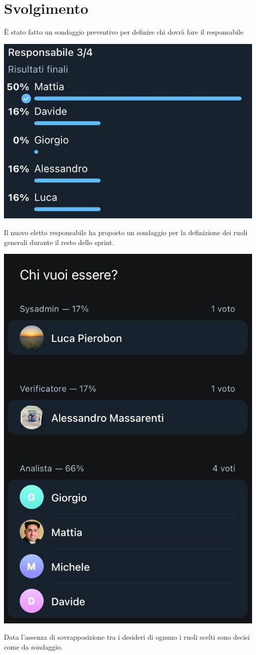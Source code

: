\section{Svolgimento}

È stato fatto un sondaggio preventivo per definire chi dovrà fare il responsabile
\begin{center}
\includegraphics[width = 0.5\linewidth]{img/sondaggio_resposabile.png}
\end{center}

Il nuovo eletto responsabile ha proposto un sondaggio per la definizione dei ruoli generali durante il resto dello sprint.

\begin{center}
    \includegraphics[width = 0.4\linewidth]{img/ruoli.png}
\end{center}

Data l'assenza di sovrapposizione tra i desideri di ognuno i ruoli scelti sono decisi come da sondaggio.